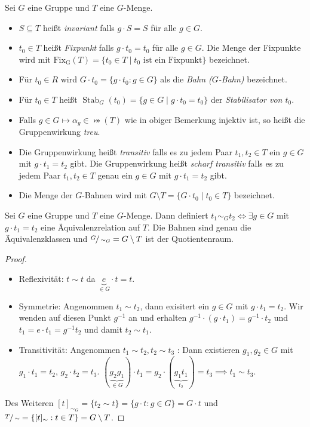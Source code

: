 \begin{definition}
	Sei $G$ eine Gruppe und $T$ eine $G$-Menge.
	\begin{itemize}
		\item $S \subseteq T$ heißt \emph{invariant} falls $g \cdot S = S$ für alle $g \in G$.
		\item $t_0 \in T$ heißt \emph{Fixpunkt} falls $g \cdot t_0 = t_0$ für alle $g \in G$.
			Die Menge der Fixpunkte wird mit $\operatorname{Fix_{G}}(T) = \{t_0 \in T \mid t_0 \text{ ist ein Fixpunkt}\} $ bezeichnet.
		\item Für $t_0 \in R$ wird $G \cdot t_0 = \{g \cdot t_0 : g \in G\}$ als die \emph{Bahn ($G$-Bahn)} bezeichnet.
		\item Für $t_0 \in T$ heißt $\operatorname{Stab}_{G}(t_0) = \{g \in G \mid g \cdot t_0 = t_0\}$ der \emph{Stabilisator von $t_0$}.
		\item Falls $g \in G \mapsto \alpha_{g} \in \bij(T)$ wie in obiger Bemerkung injektiv ist, so heißt die Gruppenwirkung \emph{treu}.
		\item Die Gruppenwirkung heißt \emph{transitiv} falls es zu jedem Paar $t_1,t_2 \in T$ ein $g \in G$ mit $g \cdot  t_1 = t_2$ gibt.
			Die Gruppenwirkung heißt \emph{scharf transitiv} falls es zu jedem Paar $t_1,t_2 \in T$ genau ein $g \in G$ mit $g \cdot t_1 = t_2$ gibt.
		\item Die Menge der $G$-Bahnen wird mit $G \setminus T = \{G \cdot t_0 \mid t_0 \in T\} $ bezeichnet.
	\end{itemize}
\end{definition}


\begin{lemma}
	Sei $G$ eine Gruppe und $T$ eine $G$-Menge.
	Dann definiert $t_1 \sim_{G} t_2 \Leftrightarrow \exists g \in G$ mit $g \cdot t_1 = t_2$ eine Äquivalenzrelation auf $T$. Die Bahnen sind genau die Äquivalenzklassen
	und $\sfrac{G}{\sim_{G}} = G \setminus T$ ist der Quotientenraum.
\end{lemma}

\begin{proof}
	\begin{itemize}
		\item Reflexivität: $t \sim t$ da $\underbrace{e}_{\in G} \cdot  t = t$.
		\item Symmetrie: Angenommen $t_1 \sim t_2$, dann exisitert ein $g \in G$ mit $g \cdot t_1 = t_2$.
			Wir wenden auf diesen Punkt $g^{-1}$ an und erhalten $g^{-1} \cdot (g \cdot t_1) = g^{-1} \cdot t_2$ und
			$t_1 = e \cdot t_1 = g^{-1} t_2$ und damit $t_2 \sim t_1$.
		\item Transitivität: Angenommen $t_1 \sim t_2, t_2 \sim t_3$ : Dann existieren $g_1, g_2 \in G$ mit $g_1 \cdot t_1 = t_2$, $g_2 \cdot t_2 = t_3$.
			$(\underbrace{g_2 g_1}_{\in G}) \cdot t_1 = g_2 \cdot (\underbrace{g_1 t_1}_{t_2}) = t_3 \implies t_1 \sim t_3$.
	\end{itemize}
	Des Weiteren $[ t ]_{\sim_{G}} = \{t_2 \sim t\} = \{g \cdot t : g \in G\} = G \cdot t$ und $\sfrac{T}{\sim} = \{[ t ]_{\sim} : t \in T\} = G \setminus T$.
\end{proof}

